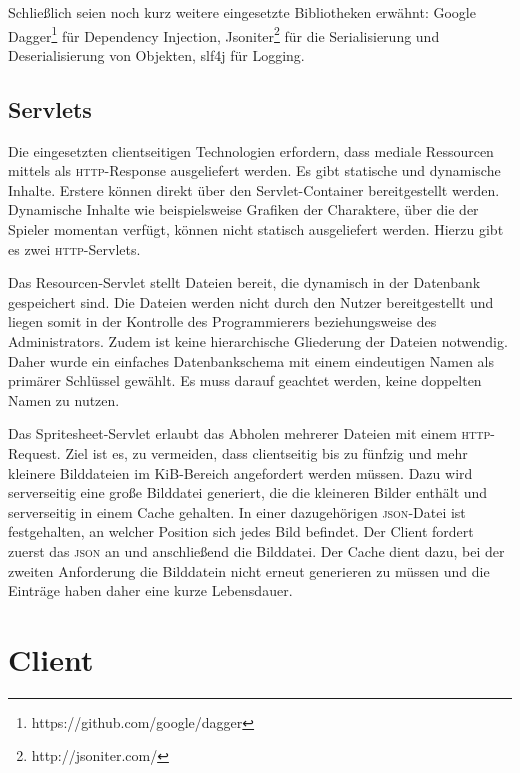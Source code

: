 \documentclass[ngerman,11pt]{report}
\begin{document}
Schließlich seien noch kurz weitere eingesetzte Bibliotheken erwähnt: Google
Dagger\footnote{https://github.com/google/dagger} für Dependency Injection,
Jsoniter\footnote{http://jsoniter.com/} für die Serialisierung und
Deserialisierung von Objekten, slf4j für Logging.

\section{Servlets}

Die eingesetzten clientseitigen Technologien erfordern, dass mediale Ressourcen mittels
als \textsc{http}-Response ausgeliefert werden. Es gibt statische und dynamische Inhalte.
Erstere können direkt über den Servlet-Container bereitgestellt werden. Dynamische Inhalte
wie beispielsweise Grafiken der Charaktere, über die der Spieler momentan verfügt, können
nicht statisch ausgeliefert werden. Hierzu gibt es zwei \textsc{http}-Servlets.

Das Resourcen-Servlet stellt Dateien bereit, die dynamisch in der Datenbank gespeichert sind.
Die Dateien werden nicht durch den Nutzer bereitgestellt und liegen somit in der Kontrolle des
Programmierers beziehungsweise des Administrators. Zudem ist keine hierarchische Gliederung
der Dateien notwendig. Daher wurde ein einfaches Datenbankschema mit einem eindeutigen Namen
als primärer Schlüssel gewählt. Es muss darauf geachtet werden, keine doppelten Namen zu nutzen.

Das Spritesheet-Servlet erlaubt das Abholen mehrerer Dateien mit einem \textsc{http}-Request.
Ziel ist es, zu vermeiden, dass clientseitig bis zu fünfzig und mehr kleinere Bilddateien im
KiB-Bereich angefordert werden müssen. Dazu wird serverseitig eine große Bilddatei generiert,
die die kleineren Bilder enthält und serverseitig in einem Cache gehalten.
In einer dazugehörigen \textsc{json}-Datei ist festgehalten, an welcher Position sich jedes Bild befindet. Der Client fordert zuerst das \textsc{json} an und anschließend die Bilddatei. Der Cache
dient dazu, bei der zweiten Anforderung die Bilddatein nicht erneut generieren zu müssen und die
Einträge haben daher eine kurze Lebensdauer.

\chapter{Client}
\end{document}
